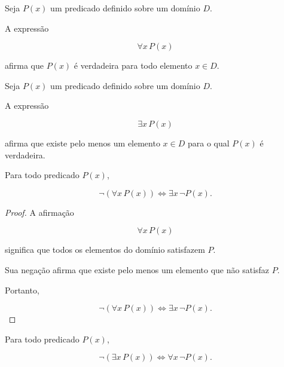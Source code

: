 \documentclass[../../main]{subfiles}
\begin{document}
\begin{defn}
	\label{def:matematica:logica-matematica:logica-de-predicados:quantificador-universal}

	Seja \(P(x)\) um predicado definido sobre um domínio \(D\).

	A expressão

	\[
		\forall x \, P(x)
	\]

	afirma que \(P(x)\) é verdadeira para todo elemento
	\(x \in D\).
\end{defn}

\begin{defn}
	\label{def:matematica:logica-matematica:logica-de-predicados:quantificador-existencial}

	Seja \(P(x)\) um predicado definido sobre um domínio \(D\).

	A expressão

	\[
		\exists x \, P(x)
	\]

	afirma que existe pelo menos um elemento
	\(x \in D\) para o qual \(P(x)\) é verdadeira.
\end{defn}

\begin{prop}
	\label{prop:matematica:logica-matematica:logica-de-predicados:negacao-quantificador-universal}

	Para todo predicado \(P(x)\),

	\[
		\neg(\forall x\,P(x))
		\Leftrightarrow
		\exists x\,\neg P(x).
	\]

\end{prop}

\begin{proof}

	A afirmação

	\[
		\forall x\,P(x)
	\]

	significa que todos os elementos do domínio satisfazem \(P\).

	Sua negação afirma que existe pelo menos um elemento que não satisfaz
	\(P\).

	Portanto,

	\[
		\neg(\forall x\,P(x))
		\Leftrightarrow
		\exists x\,\neg P(x).
	\]

\end{proof}

\begin{prop}
	\label{prop:matematica:logica-matematica:logica-de-predicados:negacao-quantificador-existencial}

	Para todo predicado \(P(x)\),

	\[
		\neg(\exists x\,P(x))
		\Leftrightarrow
		\forall x\,\neg P(x).
	\]

\end{prop}
\end{document}
